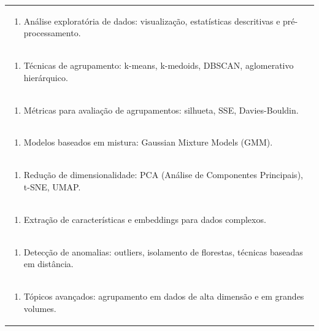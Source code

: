 \documentclass[11pt]{article}
\begin{document}
\begin{center}
\begin{longtable}{|p{4cm}|p{4cm}|p{4cm}|p{4cm}|}
\multicolumn{4}{|p{\dimexpr 16cm + 6\tabcolsep\relax}|}{\begin{enumerate}[start=2]\item Análise exploratória de dados: visualização, estatísticas descritivas e pré-processamento.\end{enumerate}}\\
\multicolumn{4}{|p{\dimexpr 16cm + 6\tabcolsep\relax}|}{\begin{enumerate}[start=3]\item Técnicas de agrupamento: k-means, k-medoids, DBSCAN, aglomerativo hierárquico.\end{enumerate}}\\
\multicolumn{4}{|p{\dimexpr 16cm + 6\tabcolsep\relax}|}{\begin{enumerate}[start=4]\item Métricas para avaliação de agrupamentos: silhueta, SSE, Davies-Bouldin.\end{enumerate}}\\
\multicolumn{4}{|p{\dimexpr 16cm + 6\tabcolsep\relax}|}{\begin{enumerate}[start=5]\item Modelos baseados em mistura: Gaussian Mixture Models (GMM).\end{enumerate}}\\
\multicolumn{4}{|p{\dimexpr 16cm + 6\tabcolsep\relax}|}{\begin{enumerate}[start=6]\item Redução de dimensionalidade: PCA (Análise de Componentes Principais), t-SNE, UMAP.\end{enumerate}}\\
\multicolumn{4}{|p{\dimexpr 16cm + 6\tabcolsep\relax}|}{\begin{enumerate}[start=7]\item Extração de características e embeddings para dados complexos.\end{enumerate}}\\
\multicolumn{4}{|p{\dimexpr 16cm + 6\tabcolsep\relax}|}{\begin{enumerate}[start=8]\item Detecção de anomalias: outliers, isolamento de florestas, técnicas baseadas em distância.\end{enumerate}}\\
\multicolumn{4}{|p{\dimexpr 16cm + 6\tabcolsep\relax}|}{\begin{enumerate}[start=9]\item Tópicos avançados: agrupamento em dados de alta dimensão e em grandes volumes.\end{enumerate}}\\

\end{longtable}
\end{center}
\end{document}
